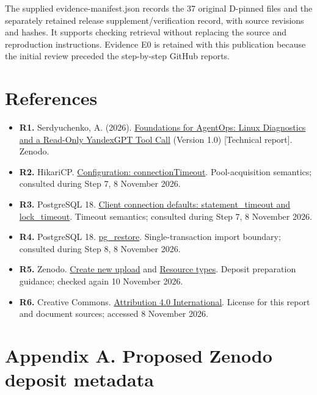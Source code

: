 \documentclass[11pt,a4paper]{article}
\begin{document}
The supplied evidence-manifest.json records the 37 original D-pinned files and the separately retained release supplement/\allowbreak{}verification record, with source revisions and hashes. It supports checking retrieval without replacing the source and reproduction instructions. Evidence E0 is retained with this publication because the initial review preceded the step-by-step GitHub reports.

\section*{References}

\begin{itemize}
\item \textbf{R1.} Serdyuchenko, A. (2026). \href{https://doi.org/10.5281/zenodo.23293506}{Foundations for AgentOps: Linux Diagnostics and a Read-Only YandexGPT Tool Call} (Version 1.0) [Technical report]. Zenodo.
\item \textbf{R2.} HikariCP. \href{https://github.com/brettwooldridge/HikariCP\#frequently-used}{Configuration: connectionTimeout}. Pool-acquisition semantics; consulted during Step 7, 8 November 2026.
\item \textbf{R3.} PostgreSQL 18. \href{https://www.postgresql.org/docs/18/runtime-config-client.html\#GUC-STATEMENT-TIMEOUT}{Client connection defaults: statement\_timeout and lock\_timeout}. Timeout semantics; consulted during Step 7, 8 November 2026.
\item \textbf{R4.} PostgreSQL 18. \href{https://www.postgresql.org/docs/18/app-pgrestore.html}{pg\_restore}. Single-transaction import boundary; consulted during Step 8, 8 November 2026.
\item \textbf{R5.} Zenodo. \href{https://help.zenodo.org/docs/deposit/create-new-upload/}{Create new upload} and \href{https://help.zenodo.org/docs/deposit/describe-records/resource-type/}{Resource types}. Deposit preparation guidance; checked again 10 November 2026.
\item \textbf{R6.} Creative Commons. \href{https://creativecommons.org/licenses/by/4.0/}{Attribution 4.0 International}. License for this report and document sources; accessed 8 November 2026.
\end{itemize}

\section*{Appendix A. Proposed Zenodo deposit metadata}
\end{document}
